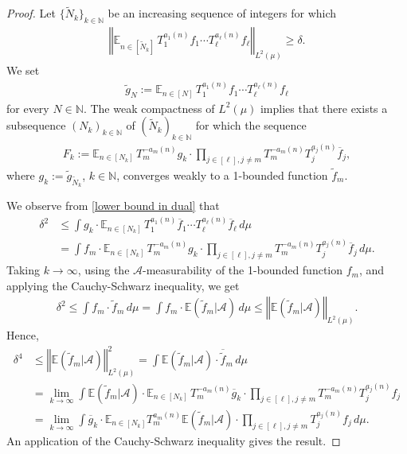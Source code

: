 \documentclass[10pt,a4paper]{amsart}
\newcommand{\CA}{{\mathcal A}}
\newcommand{\E}{{\mathbb E}}
\newcommand{\N}{{\mathbb N}}
\newcommand{\norm}[1]{\left\Vert #1\right\Vert}
\begin{document}
\begin{proof}
Let $\{\tilde{N}_k\}_{k\in\N}$ be an increasing sequence of integers for which
\begin{align}\label{lower bound in dual}
    \norm{\E_{n\in [\tilde{N}_k]} \, T_1^{a_1(n)}f_1\cdots T_\ell^{a_\ell(n)}f_\ell}_{L^2(\mu)}\geq \delta.
\end{align}
We set
\begin{align*}
    \tilde{g}_N := \E_{n\in [N]} \, T_1^{a_1(n)}{f_1}\cdots T_\ell^{a_\ell(n)}{f_\ell}
\end{align*}
for every $N\in\N$.
 The weak compactness of $L^2(\mu)$ implies  that there exists a subsequence $(N_k)_{k\in\N}$ of $(\tilde{N}_k)_{k\in\N}$ for which the sequence
\begin{align*}
    F_k:=\E_{n\in [N_k]}
	 \, T_m^{-a_m(n)}g_k\cdot \prod_{j\in [\ell], j\neq m}T_m^{-a_m(n)} T_j^{a_j(n)}\overline{f}_j,
\end{align*}
where $g_k := \tilde{g}_{\tilde{N}_k}$, $k\in\N$,  converges weakly to a 1-bounded function $\tilde{f}_m$.

We observe from \eqref{lower bound in dual} that
\begin{align*}
    \delta^2 &\leq \int {g_k} \cdot \E_{n\in [{N}_k]} \, T_1^{a_1(n)}\overline{f}_1\cdots T_\ell^{a_\ell(n)}\overline{f}_\ell\, d\mu\\
    &= \int {f}_m \cdot \E_{n\in [{N}_k]} \, T_m^{-a_m(n)} g_k \cdot  \prod_{j\in [\ell], j\neq m}T_m^{-a_m(n)} T_j^{a_j(n)}\overline{f}_j\, d\mu.
\end{align*}
Taking $k\to\infty$, using the $\CA$-measurability of the 1-bounded function  $f_m$, and applying the Cauchy-Schwarz inequality, we get
\begin{align*}
    \delta^2 \leq \int f_m \cdot \tilde{f}_m\, d\mu = \int f_m \cdot \E(\tilde{f}_m|\CA)\, d\mu \leq \norm{\E(\tilde{f}_m|\CA)}_{L^2(\mu)}.
\end{align*}
Hence,
\begin{align*}
    \delta^4 &\leq \norm{\E(\tilde{f}_m|\CA)}_{L^2(\mu)}^2 = \int \E(\tilde{f}_m|\CA) \cdot \overline{\tilde{f}}_m\, d\mu\\
    &= \lim_{k\to\infty}\int \E(\tilde{f}_m|\CA) \cdot \E_{n\in [N_k]}
	 \, T_m^{-a_m(n)}\overline{g}_k\cdot \prod_{j\in [\ell], j\neq m}T_m^{-a_m(n)} T_j^{a_j(n)}{f}_j\\
	 &= \lim_{k\to\infty}\int  \overline{g}_k \cdot \E_{n\in [N_k]} T_m^{a_m(n)}\E(\tilde{f}_m|\CA)
	 \cdot \prod_{j\in [\ell], j\neq m}T_j^{a_j(n)}{f}_j\, d\mu.
\end{align*}
An application of the Cauchy-Schwarz inequality gives the result.
\end{proof}
\end{document}
